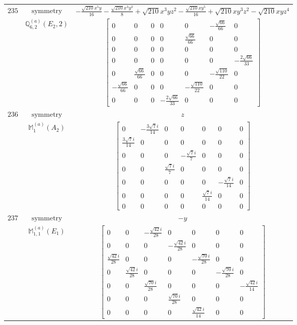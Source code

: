 \documentclass[fleqn,8pt,landscape]{jsarticle}
\begin{document}
\begin{longtable}{ccc}
$ 235 $ & $ \text{symmetry} $ & $ - \frac{\sqrt{210} x^{5} y}{16} - \frac{\sqrt{210} x^{3} y^{3}}{8} + \sqrt{210} x^{3} y z^{2} - \frac{\sqrt{210} x y^{5}}{16} + \sqrt{210} x y^{3} z^{2} - \sqrt{210} x y z^{4} $ \\
$  $ & $ \mathbb{Q}_{6,2}^{(a)}(E_{2},2) $ & $ \begin{bmatrix} 0 & 0 & 0 & 0 & 0 & - \frac{\sqrt{66}}{66} & 0 \\ 0 & 0 & 0 & 0 & \frac{\sqrt{66}}{66} & 0 & 0 \\ 0 & 0 & 0 & 0 & 0 & 0 & 0 \\ 0 & 0 & 0 & 0 & 0 & 0 & - \frac{2 \sqrt{66}}{33} \\ 0 & \frac{\sqrt{66}}{66} & 0 & 0 & 0 & - \frac{\sqrt{110}}{22} & 0 \\ - \frac{\sqrt{66}}{66} & 0 & 0 & 0 & - \frac{\sqrt{110}}{22} & 0 & 0 \\ 0 & 0 & 0 & - \frac{2 \sqrt{66}}{33} & 0 & 0 & 0 \end{bmatrix} $ \\ \hline
$ 236 $ & $ \text{symmetry} $ & $ z $ \\
$  $ & $ \mathbb{M}_{1}^{(a)}(A_{2}) $ & $ \begin{bmatrix} 0 & - \frac{3 \sqrt{7} i}{14} & 0 & 0 & 0 & 0 & 0 \\ \frac{3 \sqrt{7} i}{14} & 0 & 0 & 0 & 0 & 0 & 0 \\ 0 & 0 & 0 & - \frac{\sqrt{7} i}{7} & 0 & 0 & 0 \\ 0 & 0 & \frac{\sqrt{7} i}{7} & 0 & 0 & 0 & 0 \\ 0 & 0 & 0 & 0 & 0 & - \frac{\sqrt{7} i}{14} & 0 \\ 0 & 0 & 0 & 0 & \frac{\sqrt{7} i}{14} & 0 & 0 \\ 0 & 0 & 0 & 0 & 0 & 0 & 0 \end{bmatrix} $ \\ \hline
$ 237 $ & $ \text{symmetry} $ & $ - y $ \\
$  $ & $ \mathbb{M}_{1,1}^{(a)}(E_{1}) $ & $ \begin{bmatrix} 0 & 0 & - \frac{\sqrt{42} i}{28} & 0 & 0 & 0 & 0 \\ 0 & 0 & 0 & - \frac{\sqrt{42} i}{28} & 0 & 0 & 0 \\ \frac{\sqrt{42} i}{28} & 0 & 0 & 0 & - \frac{\sqrt{70} i}{28} & 0 & 0 \\ 0 & \frac{\sqrt{42} i}{28} & 0 & 0 & 0 & - \frac{\sqrt{70} i}{28} & 0 \\ 0 & 0 & \frac{\sqrt{70} i}{28} & 0 & 0 & 0 & - \frac{\sqrt{42} i}{14} \\ 0 & 0 & 0 & \frac{\sqrt{70} i}{28} & 0 & 0 & 0 \\ 0 & 0 & 0 & 0 & \frac{\sqrt{42} i}{14} & 0 & 0 \end{bmatrix} $ \\ \hline

\end{longtable}
\end{document}
